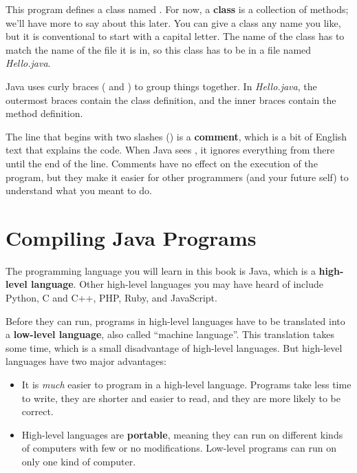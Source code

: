 
This program defines a class named .
For now, a {\bf class} is a collection of methods; we'll have more to say about this later.
You can give a class any name you like, but it is conventional to start with a capital letter.
The name of the class has to match the name of the file it is in, so this class has to be in a file named {\it Hello.java}.


Java uses curly braces (\java{\{} and \java{\}}) to group things together.
In {\it Hello.java}, the outermost braces contain the class definition, and the inner braces contain the method definition.


The line that begins with two slashes (\java{//}) is a {\bf comment}, which is a bit of English text that explains the code.
When Java sees \java{//}, it ignores everything from there until the end of the line.
Comments have no effect on the execution of the program, but they make it easier for other programmers (and your future self) to understand what you meant to do.


\section{Compiling Java Programs}


The programming language you will learn in this book is Java, which is a {\bf high-level language}.
Other high-level languages you may have heard of include Python, C and C++, PHP, Ruby, and JavaScript.


Before they can run, programs in high-level languages have to be translated into a {\bf low-level language}, also called ``machine language''.
This translation takes some time, which is a small disadvantage of high-level languages.
But high-level languages have two major advantages:

\begin{itemize}

\item It is {\em much} easier to program in a high-level language.
Programs take less time to write, they are shorter and easier to read, and they are more likely to be correct.


\item High-level languages are {\bf portable}, meaning they can run on different kinds of computers with few or no modifications.
Low-level programs can run on only one kind of computer. %

\end{itemize}


